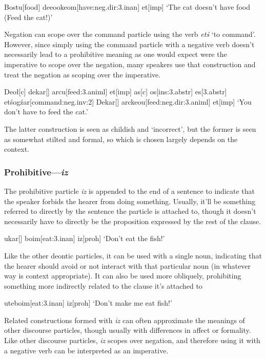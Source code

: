\documentclass[a4paper,11pt,oneside,openany]{memoir}
\begin{document}
\ex 
\begingl
Bostu[food]
de\vz[cat]
\dbl eo\lam okeom[have:{\sc neg.dir:3.inan}]
\vd et[\sc imp]
\glft `The cat doesn't have food (Feed the cat!)'
\endgl
\xe

Negation can scope over the command particle using the verb \textit{\vd et\'s} `to command'. However, since simply using the command particle with a negative verb doesn't necessarily lead to a prohibitive meaning as one would expect were the imperative to scope over the negation, many speakers use that construction and treat the negation as scoping over the imperative.

\pex
\a 
\begingl
Deo\l[\sc c]
de\vz[cat]
kar[]
arc\vs u[feed:{\sc 3.animl}]
\vd et[\sc imp]
\nogloss{,}
as[\sc c]
\vc os[\sc ins:3.abstr]
es[\sc 3.abstr]
\vd et\'sog\'zar[command:{\sc neg.inv:2}]
\endgl
\a {}
\begingl
De\vz[cat]
kar[]
arckeo\vs u[feed:{\sc neg.dir:3.animl}]
\vd et[\sc imp]
\glft `You don't have to feed the cat.'
\endgl
\xe 

The latter construction is seen as childish and `incorrect', but the former is seen as somewhat stilted and formal, so which is chosen largely depends on the context.

\subsubsection{Prohibitive---\textit{iz}}

The prohibitive particle \textit{iz} is appended to the end of a sentence to indicate that the speaker forbids the hearer from doing something. Usually, it'll be something referred to directly by the sentence the particle is attached to, though it doesn't necessarily have to directly be the proposition expressed by the rest of the clause.

\ex 
\begingl
\Engma u\vz[fish]
kar[]
bo\vs im[eat:{\sc 3.inan}]
iz[\sc proh]
\glft `Don't eat the fish!'
\endgl
\xe 

Like the other deontic particles, it can be used with a single noun, indicating that the hearer should avoid or not interact with that particular noun (in whatever way is context appropriate). It can also be used more obliquely, prohibiting something more indirectly related to the clause it's attached to

\ex
\begingl
\Engma u\vz[fish]
te\vd[\sc 1]
bo\vs im[eat:{\sc 3.inan}]
iz[\sc proh]
\glft `Don't make me eat fish!'
\endgl
\xe

Related constructions formed with \textit{iz} can often approximate the meanings of other discourse particles, though usually with differences in affect or formality. Like other discourse particles, \textit{iz} scopes over negation, and therefore using it with a negative verb can be interpreted as an imperative. 
\end{document}
